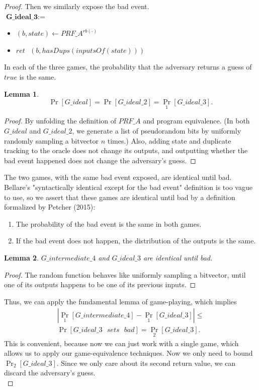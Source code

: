 \documentclass[12pt,lot, lof]{puthesis}
\newenvironment{game}
{ \begin{itemize}[noitemsep,nolistsep] 
}
{ \end{itemize}                  }
\newcommand{\s} {\textrm{ }}
\newtheorem{lem}{Lemma}[thm]
\begin{document}
{\begin{proof}
Then we similarly expose the bad event.\\

$\textbf{G\_ideal\_3} := $
\begin{game}
\item[] $(b, state) \leftarrow PRF\_A^{rb(\cdot)}$ 
\item[] $ret \s (b, hasDups(inputsOf(state)))$ \\
\end{game}

In each of the three games, the probability that the adversary returns a guess of $true$ is the same.

\begin{lem}$$\Pr[G\_ideal] = \Pr[G\_ideal\_2] = \Pr_1[G\_ideal\_3].$$\end{lem}
\begin{proof}By unfolding the definition of $PRF\_A$ and program equivalence. (In both $G\_ideal$ and $G\_ideal\_2$, we generate a list of pseudorandom bits by uniformly randomly sampling a bitvector $n$ times.) Also, adding state and duplicate tracking to the oracle does not change its outputs, and outputting whether the bad event happened does not change the adversary's guess. \end{proof}

The two games, with the same bad event exposed, are identical until bad. Bellare's "syntactically identical except for the bad event" definition is too vague to use, so we assert that these games are identical until bad by a definition formalized by Petcher (2015):

\begin{enumerate}
\item The probability of the bad event is the same in both games. 
\item If the bad event does not happen, the distribution of the outputs is the same. 
\end{enumerate}

\begin{lem}$G\_intermediate\_4$ and $G\_ideal\_3$ are identical until bad.\end{lem}
\begin{proof} The random function behaves like uniformly sampling a bitvector, until one of its outputs happens to be one of its previous inputs. \end{proof}

Thus, we can apply the fundamental lemma of game-playing, which implies
\begin{gather*}
|\Pr_1[G\_intermediate\_4] - \Pr_1[G\_ideal\_3]| \leq \\ 
\Pr[G\_ideal\_3 \s sets \s bad] = \Pr_2[G\_ideal\_3].
\end{gather*}
This is convenient, because now we can just work with a single game, which allows us to apply our game-equivalence techniques. Now we only need to bound $\Pr_2[G\_ideal\_3]$. Since we only care about its second return value, we can discard the adversary's guess.\\


\end{proof}}
\end{document}
